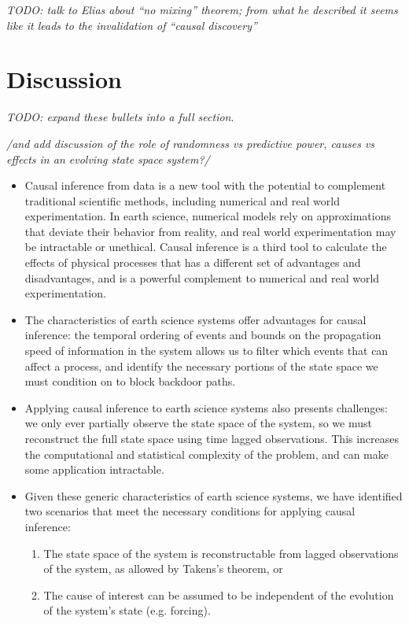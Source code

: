\documentclass[12pt]{article}
\begin{document}
\textit{
  TODO: talk to Elias about ``no mixing'' theorem; from what he
  described it seems like it leads to the invalidation of ``causal
  discovery''
}

\section{Discussion}

\emph{TODO: expand these bullets into a full section}.

\emph{/and add discussion of the role of randomness vs predictive
  power, causes vs effects in an evolving state space system?/}

\begin{itemize}
\item Causal inference from data is a new tool with the potential to
  complement traditional scientific methods, including numerical and
  real world experimentation. In earth science, numerical models rely
  on approximations that deviate their behavior from reality, and real
  world experimentation may be intractable or unethical. Causal
  inference is a third tool to calculate the effects of physical
  processes that has a different set of advantages and
  disadvantages, and is a powerful complement to numerical and real
  world experimentation.
\item The characteristics of earth science systems offer advantages
  for causal inference: the temporal ordering of events and bounds on
  the propagation speed of information in the system allows us to
  filter which events that can affect a process, and identify the
  necessary portions of the state space we must condition on to block
  backdoor paths.
\item Applying causal inference to earth science systems also presents
  challenges: we only ever partially observe the state space of the
  system, so we must reconstruct the full state space using time
  lagged observations. This increases the computational and
  statistical complexity of the problem, and can make some application
  intractable.
\item Given these generic characteristics of earth science systems, we
  have identified two scenarios that meet the necessary conditions for
  applying causal inference:
  \begin{enumerate}
  \item The state space of the system is reconstructable
    from lagged observations of the system, as allowed by
    Takens's theorem, or
  \item The cause of interest can be assumed to be
    independent of the evolution of the system's state
    (e.g. forcing).
  \end{enumerate}
\end{itemize}





\end{document}
